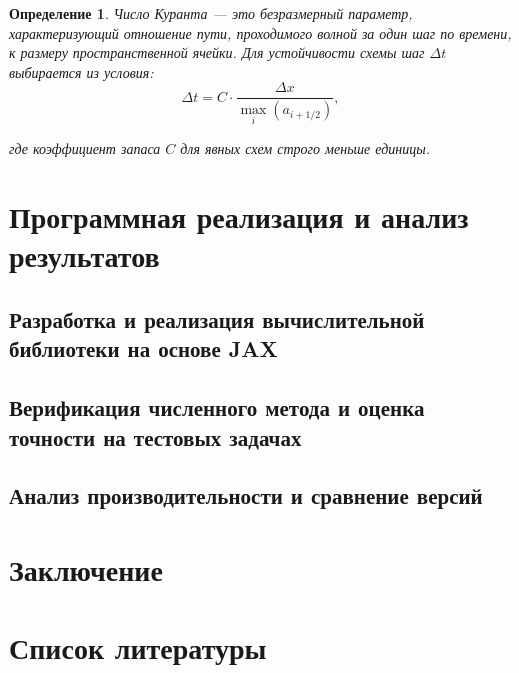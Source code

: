 \documentclass[12pt, a4paper]{article}
\theoremstyle{gostdef}
\newtheorem{defenv}{Определение}[section]
\begin{document}
	\begin{defenv}
		Число Куранта — это безразмерный параметр, характеризующий отношение пути, проходимого волной за один шаг по времени, к размеру пространственной ячейки. Для устойчивости схемы шаг $\Delta t$ выбирается из условия:
		\[
			\Delta t = C \cdot \frac{\Delta x}{\max_i(a_{i+1/2})},
		\]
		
		где коэффициент запаса $C$ для явных схем строго меньше единицы.
	\end{defenv}
	
	\section{Программная реализация и анализ результатов}
	\subsection{Разработка и реализация вычислительной библиотеки на основе JAX}
	\subsection{Верификация численного метода и оценка точности на тестовых задачах}
	\subsection{Анализ производительности и сравнение версий}
	
	\section{Заключение}
	\section{Список литературы}
	
\end{document}
